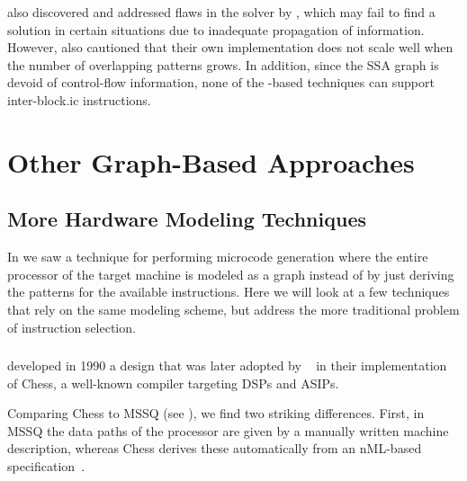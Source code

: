 \citeauthor{Buchwald2010} also discovered and addressed flaws in the
 solver by \citeauthor{Eckstein2003}, which may fail to
find a solution in certain situations due to inadequate propagation of
information.
%
However, \citeauthor{Buchwald2010} also cautioned that their own
implementation does not scale well when the number of overlapping
\glspl{pattern} grows.
%
In addition, since the \gls{SSA graph} is devoid of control-flow information,
none of the -based techniques can support
\gls{inter-block.ic} \glspl{instruction}.


\section{Other Graph-Based Approaches}

\subsection{More Hardware Modeling Techniques}

In  we saw a technique for performing \gls{microcode
  generation} where the entire processor of the \gls{target machine} is modeled
as a \gls{graph} instead of by just deriving the \glspl{pattern} for the
available \glspl{instruction}.
%
Here we will look at a few techniques that rely
on the same modeling scheme, but address the more traditional problem of
\gls{instruction selection}.


\subsubsection{}

\textcite{Lanneer1990} developed in 1990 a design that was later adopted by
\citeauthor{VanPraet1994}~\cite{VanPraet1994, VanPraet2001} in their
implementation of \gls{Chess}, a well-known compiler targeting \glspl{DSP} and
\glspl{ASIP}.

Comparing \gls{Chess} to \gls{MSSQ} (see
), we find two striking
differences.
%
First, in \gls{MSSQ} the data paths of the processor are given by a manually
written \gls{machine description}, whereas \gls{Chess} derives these
automatically from an \mbox{\gls{nML}-based} specification~\cite{Fauth1993,
  Fauth1995}.

